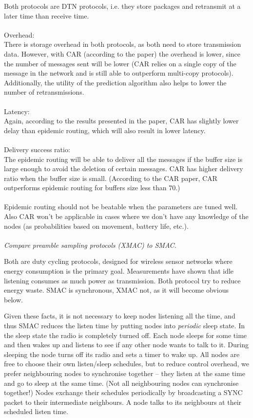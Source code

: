 \documentclass[12pt]{article}
\newcommand*\circled[1]{\tikz[baseline=(char.base)]{
		\node[shape=circle,draw,inner sep=0pt] (char) {#1};}}
\begin{document}
Both protocols are DTN protocols, i.e. they store packages and retransmit at
a later time than receive time.
\\
\\
Overhead:\\
There is storage overhead in both protocols, as both need to store transmission
data. However, with CAR (according to the paper) the overhead is lower, since
the number of messages sent will be lower (CAR relies on a single copy of the
message in the network and is still able to outperform multi-copy protocols).
Additionally, the utility of the prediction algorithm also helps to lower
the number of retransmissions.
\\
\\
Latency:\\
Again, according to the results presented in the paper, CAR has slightly lower
delay than epidemic routing, which will also result in lower latency.
\\
\\
Delivery success ratio:\\
The epidemic routing will be able to deliver all the messages if the buffer
size is large enough to avoid the deletion of certain messages. CAR has higher
delivery ratio when the buffer size is small. (According to the CAR paper, 
CAR outperforms epidemic routing for buffers size less than 70.) 
\\
\\
Epidemic routing should not be beatable when the parameters are tuned well.
Also CAR won't be applicable in cases where we don't have any knowledge of
the nodes (as probabilities based on movement, battery life, etc.).
\\
\\
\textit{\circled{7.} Compare preamble sampling protocols (XMAC) to SMAC.}

Both are duty cycling protocols, designed for wireless sensor networks where
energy consumption is the primary goal. Measurements have shown that idle
listening consumes as much power as transmission. Both protocol try to reduce
energy waste. SMAC is synchronous, XMAC not, as it will become obvious below.

Given these facts, it is not necessary to keep nodes listening all the time, and
thus SMAC reduces the listen time by putting nodes into \emph{periodic} sleep
state. In the sleep state the radio is completely turned off. Each node 
sleeps for some time and then wakes up and listens to see if any other
node wants to talk to it. During sleeping the node turns off its radio and sets
a timer to wake up. All nodes are free to choose their own listen/sleep
schedules, but to reduce control overhead, we prefer neighbouring nodes to
synchronise together -- they listen at the same time and go to sleep at the
same time. (Not all neighbouring nodes can synchronise together!) Nodes
exchange their schedules periodically by broadcasting a SYNC packet to their
intermediate neighbours. A node talks to its neighbours at their scheduled
listen time.
\end{document}
